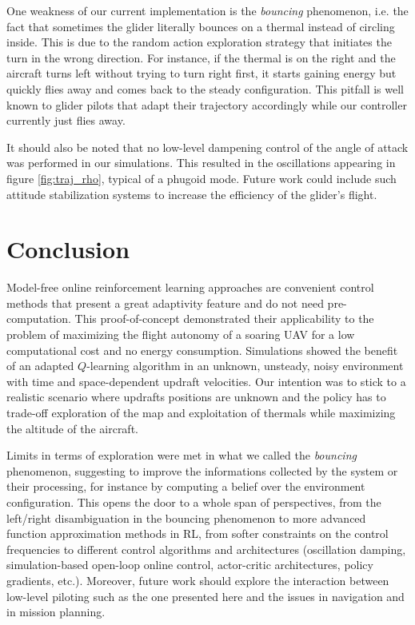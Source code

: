 \documentclass{ifacconf}
\begin{document}
One weakness of our current implementation is the \textit{bouncing} phenomenon, i.e. the fact that sometimes the glider literally bounces on a thermal instead of circling inside. This is due to the random action exploration strategy that initiates the turn in the wrong direction. For instance, if the thermal is on the right and the aircraft turns left without trying to turn right first, it starts gaining energy but quickly flies away and comes back to the steady configuration. This pitfall is well known to glider pilots that adapt their trajectory accordingly while our controller currently just flies away.

It should also be noted that no low-level dampening control of the angle of attack was performed in our simulations. This resulted in the oscillations appearing in figure \ref{fig:traj_rho}, typical of a phugoid mode. Future work could include such attitude stabilization systems to increase the efficiency of the glider's flight.

\section{Conclusion}
\label{sec:conclu}

Model-free online reinforcement learning approaches are convenient control methods that present a great adaptivity feature and do not need pre-computation. This proof-of-concept demonstrated their applicability to the problem of maximizing the flight autonomy of a soaring UAV for a low computational cost and no energy consumption. Simulations showed the benefit of an adapted $Q$-learning algorithm in an unknown, unsteady, noisy environment with time and space-dependent updraft velocities. Our intention was to stick to a realistic scenario where updrafts positions are unknown and the policy has to trade-off exploration of the map and exploitation of thermals while maximizing the altitude of the aircraft.

Limits in terms of exploration were met in what we called the \textit{bouncing} phenomenon, suggesting to improve the informations collected by the system or their processing, for instance by computing a belief over the environment configuration. This opens the door to a whole span of perspectives, from the left/right disambiguation in the bouncing phenomenon to more advanced function approximation methods in RL, from softer constraints on the control frequencies to different control algorithms and architectures (oscillation damping, simulation-based open-loop online control, actor-critic architectures, policy gradients, etc.). Moreover, future work should explore the interaction between low-level piloting such as the one presented here and the issues in navigation and in mission planning.

%



\end{document}

